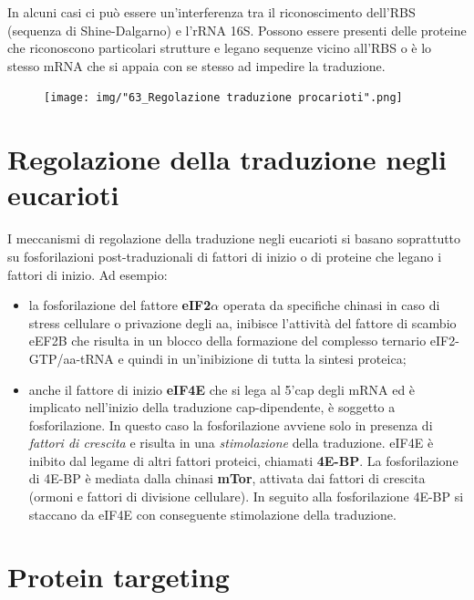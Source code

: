 \documentclass[11pt]{book}
\begin{document}
In alcuni casi ci può essere un'interferenza tra il riconoscimento
dell'RBS (sequenza di Shine-Dalgarno) e l'rRNA 16S. Possono essere
presenti delle proteine che riconoscono particolari strutture e legano
sequenze vicino all'RBS o è lo stesso mRNA che si appaia con se stesso
ad impedire la traduzione.

\begin{figure}[htp]
\centering
\texttt{[image: img/"63\_Regolazione traduzione procarioti".png]}
\caption{}
\label{regolazione-traduzione-procarioti}
\end{figure}

\section{Regolazione della traduzione negli
eucarioti}\label{regolazione-della-traduzione-negli-eucarioti}

I meccanismi di regolazione della traduzione negli eucarioti si basano
soprattutto su fosforilazioni post-traduzionali di fattori di inizio o
di proteine che legano i fattori di inizio. Ad esempio:

\begin{itemize}
\itemsep1pt\parskip0pt
\item
  la fosforilazione del fattore \textbf{eIF2\(\alpha\)} operata da
  specifiche chinasi in caso di stress cellulare o privazione degli aa,
  inibisce l'attività del fattore di scambio eEF2B che risulta in un
  blocco della formazione del complesso ternario eIF2-GTP/aa-tRNA e
  quindi in un'inibizione di tutta la sintesi proteica;
\item
  anche il fattore di inizio \textbf{eIF4E} che si lega al 5'cap degli
  mRNA ed è implicato nell'inizio della traduzione cap-dipendente, è
  soggetto a fosforilazione. In questo caso la fosforilazione avviene
  solo in presenza di \emph{fattori di crescita} e risulta in una
  \emph{stimolazione} della traduzione. eIF4E è inibito dal legame di
  altri fattori proteici, chiamati \textbf{4E-BP}. La fosforilazione di
  4E-BP è mediata dalla chinasi \textbf{mTor}, attivata dai fattori di
  crescita (ormoni e fattori di divisione cellulare). In seguito alla
  fosforilazione 4E-BP si staccano da eIF4E con conseguente stimolazione
  della traduzione.
\end{itemize}

\section{Protein targeting}\label{protein-targeting}
\end{document}
